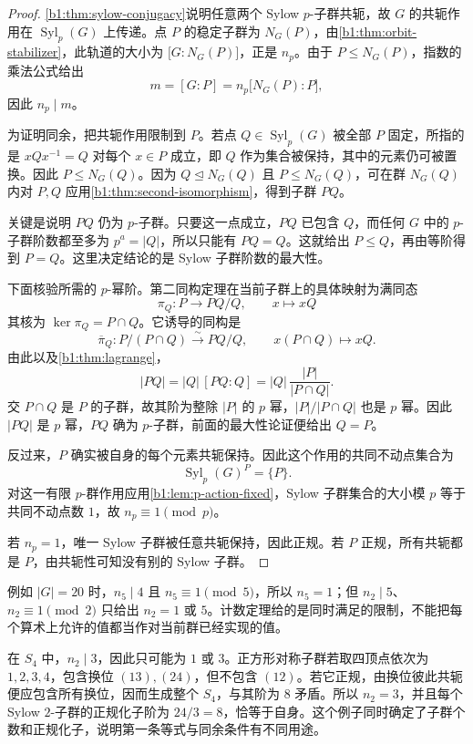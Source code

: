 \begin{proof}
	\cref{b1:thm:sylow-conjugacy}说明任意两个 Sylow \(p\)-子群共轭，故 \(G\) 的共轭作用在 \(\operatorname{Syl}_p(G)\) 上传递。点 \(P\) 的稳定子群为 \(N_G(P)\)，由\cref{b1:thm:orbit-stabilizer}，此轨道的大小为 \(\bigl[G:N_G(P)\bigr]\)，正是 \(n_p\)。由于 \(P\leq N_G(P)\)，指数的乘法公式给出
	\[
		m=[G:P]=n_p\bigl[N_G(P):P\bigr],
	\]
	因此 \(n_p\mid m\)。

	为证明同余，把共轭作用限制到 \(P\)。若点 \(Q\in\operatorname{Syl}_p(G)\) 被全部 \(P\) 固定，所指的是 \(xQx^{-1}=Q\) 对每个 \(x\in P\) 成立，即 \(Q\) 作为集合被保持，其中的元素仍可被置换。因此 \(P\leq N_G(Q)\)。因为 \(Q\trianglelefteq N_G(Q)\) 且 \(P\leq N_G(Q)\)，可在群 \(N_G(Q)\) 内对 \(P,Q\) 应用\cref{b1:thm:second-isomorphism}，得到子群 \(PQ\)。

	关键是说明 \(PQ\) 仍为 \(p\)-子群。只要这一点成立，\(PQ\) 已包含 \(Q\)，而任何 \(G\) 中的 \(p\)-子群阶数都至多为 \(p^a=|Q|\)，所以只能有 \(PQ=Q\)。这就给出 \(P\leq Q\)，再由等阶得到 \(P=Q\)。这里决定结论的是 Sylow 子群阶数的最大性。

	下面核验所需的 \(p\)-幂阶。第二同构定理在当前子群上的具体映射为满同态
	\[
		\pi_Q:P\longrightarrow PQ/Q,\qquad x\longmapsto xQ
	\]
	其核为 \(\ker\pi_Q=P\cap Q\)。它诱导的同构是
	\[
		\overline{\pi}_Q:P/(P\cap Q)\xrightarrow{\sim}PQ/Q,\qquad x(P\cap Q)\longmapsto xQ.
	\]
	由此以及\cref{b1:thm:lagrange}，
	\[
		|PQ|=|Q|\,[PQ:Q] =|Q|\,\frac{|P|}{|P\cap Q|}.
	\]
	交 \(P\cap Q\) 是 \(P\) 的子群，故其阶为整除 \(|P|\) 的 \(p\) 幂，\(|P|/|P\cap Q|\) 也是 \(p\) 幂。因此 \(|PQ|\) 是 \(p\) 幂，\(PQ\) 确为 \(p\)-子群，前面的最大性论证便给出 \(Q=P\)。

	反过来，\(P\) 确实被自身的每个元素共轭保持。因此这个作用的共同不动点集合为
	\[
		\operatorname{Syl}_p(G)^P=\{P\}.
	\]
	对这一有限 \(p\)-群作用应用\cref{b1:lem:p-action-fixed}，Sylow 子群集合的大小模 \(p\) 等于共同不动点数 \(1\)，故 \(n_p\equiv1\pmod p\)。

	若 \(n_p=1\)，唯一 Sylow 子群被任意共轭保持，因此正规。若 \(P\) 正规，所有共轭都是 \(P\)，由共轭性可知没有别的 Sylow 子群。
\end{proof}

例如 \(|G|=20\) 时，\(n_5\mid4\) 且 \(n_5\equiv1\pmod5\)，所以 \(n_5=1\)；但 \(n_2\mid5\)、\(n_2\equiv1\pmod2\) 只给出 \(n_2=1\) 或 \(5\)。计数定理给的是同时满足的限制，不能把每个算术上允许的值都当作对当前群已经实现的值。

\ProseParagraphBreak
在 \(S_4\) 中，\(n_2\mid3\)，因此只可能为 \(1\) 或 \(3\)。正方形对称子群若取四顶点依次为 \(1,2,3,4\)，包含换位 \((13),(24)\)，但不包含 \((12)\)。若它正规，由换位彼此共轭便应包含所有换位，因而生成整个 \(S_4\)，与其阶为 \(8\) 矛盾。所以 \(n_2=3\)，并且每个 Sylow \(2\)-子群的正规化子阶为 \(24/3=8\)，恰等于自身。这个例子同时确定了子群个数和正规化子，说明第一条等式与同余条件有不同用途。

